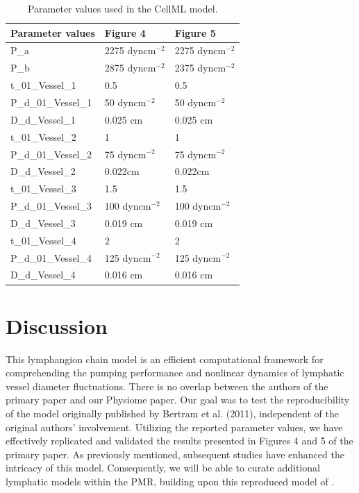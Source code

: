 \documentclass[fleqn,10pt]{physiome}
\begin{document}
\begin{table}[h]
\caption{Parameter values used in the CellML model.}
\label{table_para1}
\begin{center}


\begin{tabular}{|l|l|l|}
\hline
Parameter values    & Figure 4     & Figure 5     \\
\hline
P\_a                & 2275 dyncm$^{-2}$ & 2275 dyncm$^{-2}$ \\
P\_b                & 2875 dyncm$^{-2}$ & 2375 dyncm$^{-2}$ \\
t\_01\_Vessel\_1    & 0.5          & 0.5          \\
P\_d\_01\_Vessel\_1 & 50 dyncm$^{-2}$   & 50 dyncm$^{-2}$   \\
D\_d\_Vessel\_1     & 0.025 cm     & 0.025 cm     \\
t\_01\_Vessel\_2    & 1            & 1            \\
P\_d\_01\_Vessel\_2 & 75 dyncm$^{-2}$   & 75 dyncm$^{-2}$   \\
D\_d\_Vessel\_2     & 0.022cm      & 0.022cm      \\
t\_01\_Vessel\_3    & 1.5          & 1.5          \\
P\_d\_01\_Vessel\_3 & 100 dyncm$^{-2}$  & 100 dyncm$^{-2}$  \\
D\_d\_Vessel\_3     & 0.019 cm     & 0.019 cm     \\
t\_01\_Vessel\_4    & 2            & 2            \\
P\_d\_01\_Vessel\_4 & 125 dyncm$^{-2}$  & 125 dyncm$^{-2}$  \\
D\_d\_Vessel\_4     & 0.016 cm     & 0.016 cm   \\ 
\hline
\end{tabular}
\end{center}
\end{table}

\newpage

\section{Discussion}
This lymphangion chain model is an efficient computational framework for comprehending the pumping performance and nonlinear dynamics of lymphatic vessel diameter fluctuations. There is no overlap between the authors of the primary paper and our Physiome paper. Our goal was to test the reproducibility of the model originally published by Bertram et al. (2011), independent of the original authors' involvement. Utilizing the reported parameter values, we have effectively replicated and validated the results presented in Figures 4 and 5 of the primary paper. As previously mentioned, subsequent studies have enhanced the intricacy of this model. Consequently, we will be able to curate additional lymphatic models within the PMR, building upon this reproduced model of \cite{bertram2011simulation}.
\end{document}
